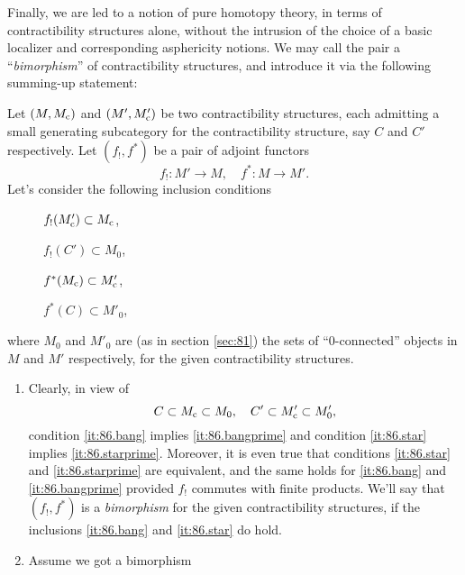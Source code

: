 Finally, we are led to a notion of pure homotopy theory, in terms of
contractibility structures alone, without the intrusion of the choice
of a basic localizer \scrW{} and corresponding asphericity notions. We
may call the pair a ``\emph{bimorphism}'' of contractibility
structures, and introduce it via the following summing-up statement:
\begin{scholie}
  Let $(M,M_{\mathrm{c}})$ and $(M',M'_{\mathrm{c}})$ be two
  contractibility structures, each admitting a small generating
  subcategory for the contractibility structure, say $C$ and $C'$
  respectively. Let $(f_!,f^*)$ be a pair of adjoint functors
  \[f_!:M'\to M, \quad f^*:M\to M'.\]
  Let's consider the following inclusion conditions
  \begin{description}
  \item[]
    $f_!(M'_{\mathrm{c}})\subset M_{\mathrm{c}}$,
  \item[] 
    $f_!(C')\subset M_0$,
  \item[]
    $f^*(M_{\mathrm{c}})\subset M'_{\mathrm{c}}$,
  \item[] 
    $f^*(C)\subset M'_0$,
  \end{description}
  where $M_0$ and $M'_0$ are \textup(as in section
  \ref{sec:81}\textup) the sets of ``$0$-connected'' objects in $M$
  and $M'$ respectively, for the given contractibility structures.
  \begin{enumerate}[label=\alph*),font=\normalfont]
  \item\label{it:86.a}
    Clearly, in view of
    \[C \subset M_{\mathrm{c}} \subset M_0, \quad C'\subset M'_{\mathrm{c}}\subset
    M'_0,\]
    condition \textup{\ref{it:86.bang}} implies
    \textup{\ref{it:86.bangprime}} and condition
    \textup{\ref{it:86.star}} implies
    \textup{\ref{it:86.starprime}}. Moreover, it is even true that conditions \textup{\ref{it:86.star}} and
    \textup{\ref{it:86.starprime}} are equivalent, and the same holds
    for \textup{\ref{it:86.bang}} and \textup{\ref{it:86.bangprime}}
    provided $f_!$ commutes with finite products. We'll say that
    $(f_!,f^*)$ is a \emph{bimorphism} for the given contractibility
    structures, if the inclusions \textup{\ref{it:86.bang}} and
    \textup{\ref{it:86.star}} do hold.
  \item\label{it:86.b} Assume we got a bimorphism

\end{enumerate}
\end{scholie}
